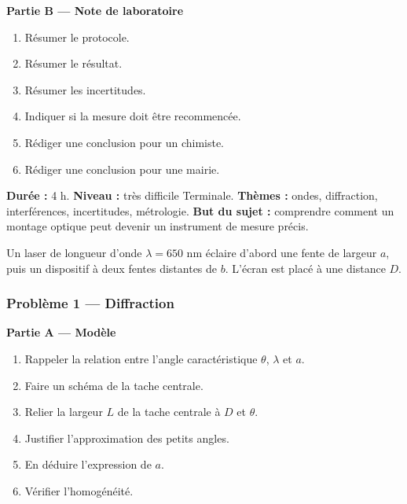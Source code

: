 \documentclass[11pt,a4paper]{article}
\begin{document}
\begin{difficile}
\textbf{Partie B — Note de laboratoire}
\begin{enumerate}
  \item Résumer le protocole.
  \item Résumer le résultat.
  \item Résumer les incertitudes.
  \item Indiquer si la mesure doit être recommencée.
  \item Rédiger une conclusion pour un chimiste.
  \item Rédiger une conclusion pour une mairie.
\end{enumerate}
\end{difficile}

\hypertarget{PC-EXCELLENCE-03}{}
\begin{difficile}
\textbf{Durée :} 4 h.  
\textbf{Niveau :} très difficile Terminale.  
\textbf{Thèmes :} ondes, diffraction, interférences, incertitudes, métrologie.  
\textbf{But du sujet :} comprendre comment un montage optique peut devenir un instrument de mesure précis.

\medskip

Un laser de longueur d'onde $\lambda=650$ nm éclaire d'abord une fente de largeur $a$, puis un dispositif à deux fentes distantes de $b$. L'écran est placé à une distance $D$.

\subsubsection*{Problème 1 — Diffraction}

\textbf{Partie A — Modèle}
\begin{enumerate}
  \item Rappeler la relation entre l'angle caractéristique $\theta$, $\lambda$ et $a$.
  \item Faire un schéma de la tache centrale.
  \item Relier la largeur $L$ de la tache centrale à $D$ et $\theta$.
  \item Justifier l'approximation des petits angles.
  \item En déduire l'expression de $a$.
  \item Vérifier l'homogénéité.
\end{enumerate}


\end{difficile}
\end{document}
